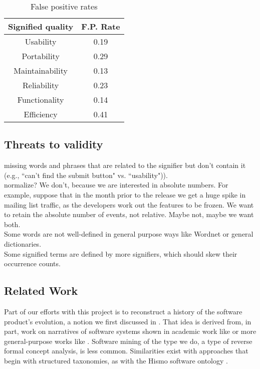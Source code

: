 \documentclass[conference, compsoc]{IEEEtran}
\begin{document}
\begin{table}
	\caption{False positive rates}
	\centering
	\label{tbl:error}
\begin{tabular}{|c|c|}
\hline
Signified quality & F.P. Rate  \\
\hline
\hline
Usability & 0.19\\ \hline
Portability & 0.29\\ \hline
Maintainability & 0.13\\ \hline
Reliability & 0.23\\ \hline
Functionality & 0.14 \\ \hline
Efficiency & 0.41\\ \hline
\hline
\end{tabular}
\end{table}

\subsection{Threats to validity}
missing words and phrases that are related to the signifier but don't contain it (e.g., ``can't find the submit button" vs. ``usability")). \\
normalize? We don't, because we are interested in absolute numbers. For example, suppose that in the month prior to the release we get a huge spike in mailing list traffic, as the developers work out the features to be frozen. We want to retain the absolute number of events, not relative. Maybe not, maybe we want both.\\
Some words are not well-defined in general purpose ways like Wordnet or general dictionaries.\\
Some signified terms are defined by more signifiers, which should skew their occurrence counts.\\
\subsection{Related Work}
Part of our efforts with this project is to reconstruct a history of the software product's evolution, a notion we first discussed in \cite{Ernst07icsm}. That idea is derived from, in part, work on narratives of software systems shown in academic work like \cite{Anton2001} or more general-purpose works like \cite{waldo93}. Software mining of the type we do, a type of reverse formal concept analysis, is less common. Similarities exist with approaches that begin with structured taxonomies, as with the Hismo software ontology \cite{Girba2006}.
\end{document}
